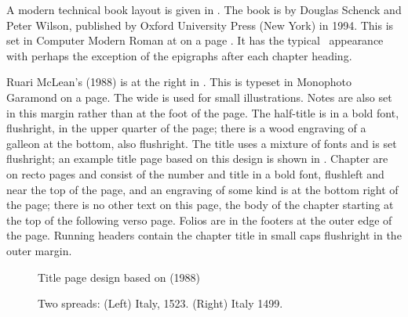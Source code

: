 \documentclass[10pt,a4paper,extrafontsizes]{memoir}
\begin{document}
\begin{paracol}{2}
\switchEng
    A modern technical book layout is given in . The book
is  by Douglas Schenck and Peter
Wilson, published by Oxford University Press (New York) in 1994. This is
set in Computer Modern Roman at  
on a page . 
It has the typical \ltx\ appearance with perhaps the exception of the
epigraphs after each chapter heading.

Ruari McLean's  (1988) is at the right in . This is typeset in  
Monophoto Garamond 
on a  page. The wide
\foredge{} is used for small illustrations. 
Notes are also set in this
margin rather than at the foot of the page.
The half-title 
is in a bold font, flushright, in the 
upper quarter of the page; there is a wood engraving of a galleon at the 
bottom, also flushright. The title uses a mixture of fonts
and is set flushright; an example title page based on this design is shown
in . Chapter are on recto
pages and consist of the number and title in a bold font, flushleft and near
the top of the page, and an engraving of some kind is at the bottom
right of the page; there is no other text on this page, the body of
the chapter starting at the top of the following verso page. 
Folios are in the footers at the outer edge
of the page. Running headers contain the chapter
title in small caps flushright in the outer margin.
\end{paracol}

\begin{figure}
\centering
\begin{showtitle}
\titleTH
\end{showtitle}
\caption{Title page design based on  (1988)} \label{fig:titleTH}
\end{figure}


\begin{figure}
\centering
\begin{minipage}[b]{\pwlayi}
\end{minipage}
\hfill
\begin{minipage}[b]{\pwlayi}
\end{minipage}
\caption[Two spreads: Italy, 1523 and 1499]%
        {Two spreads: (Left) Italy, 1523.
         (Right) Italy 1499.} \label{fb:8}
\end{figure}
\end{document}
